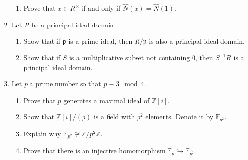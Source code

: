\documentclass[11pt]{article}
\newcommand{\bF}{\mathbb{F}}
\newcommand{\bZ}{\mathbb{Z}}
\newcommand{\fp}{\mathfrak{p}}
\begin{document}
\begin{enumerate}
{\begin{enumerate}
{    Let $\hat N:R\to\bZ$ be given by the following rule.
    \[\hat N(r) = \min_{x\in R\setminus\{0\}} N(xr).\]
    Prove that $\hat N$ is a Euclidean norm on $R$, and also that it satisfies the further condition that if $a|b$ and $b\not=0$, then $\hat N(a)\le\hat N(b)$.
    }
    \item{
    Prove that $x\in R^\times$ if and only if $\hat N(x)=\hat N(1)$.
    }
  \end{enumerate}
  }
  \item{
  Let $R$ be a principal ideal domain.
  \begin{enumerate}
    \item{
    Show that if $\fp$ is a prime ideal, then $R/\fp$ is also a principal ideal domain.
    }
    \item{
    Show that if $S$ is a multiplicative subset not containing $0$, then $S^{-1}R$ is a principal ideal domain.
    }
  \end{enumerate}
  }
  \item{
  Let $p$ a prime number so that $p\equiv3\mod 4$.
  \begin{enumerate}
    \item{
    Prove that $p$ generates a maximal ideal of $\bZ[i]$.
    }
    \item{
    Show that $\bZ[i]/(p)$ is a field with $p^2$ elements.  Denote it by $\bF_{p^2}$.
    }
    \item{
    Explain why $\bF_{p^2}\not\cong\bZ/p^2\bZ$.
    }
    \item{
    Prove that there is an injective homomorphism $\bF_p\hookrightarrow\bF_{p^2}$.
    }
  \end{enumerate}
  }
\end{enumerate}
\end{document}
